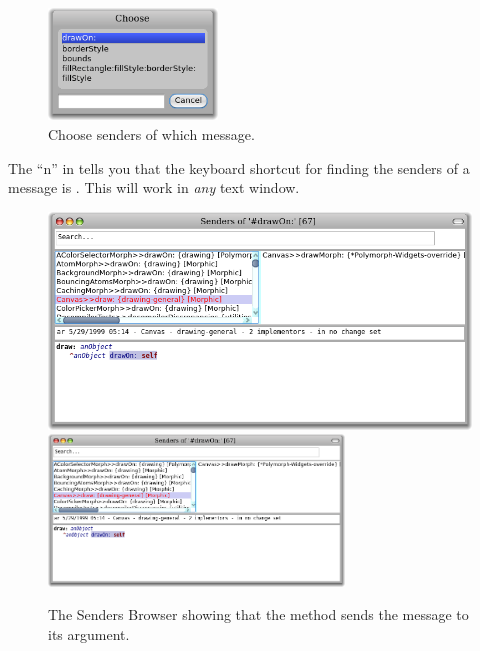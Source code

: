 \documentclass[a4paper,10pt,twoside]{book}
\begin{document}
\begin{figure}[htb]
\centerline {\includegraphics[width=0.4\textwidth]{SendersOfDrawOn2}}
\caption{Choose senders of which message.}
\end{figure}

The ``n'' in  tells you that the keyboard shortcut for finding the senders of a message is . This will work in \emph{any} text window.


\begin{figure}[htbp]
	\begin{center}
   \ifluluelse
		{\includegraphics[width=\textwidth]{CanvasDraw}}
		{\includegraphics[width=0.7\textwidth]{CanvasDraw}}
	\end{center}
	\caption{The Senders Browser showing that the  method sends the  message to its argument.	}
\end{figure}
\end{document}

